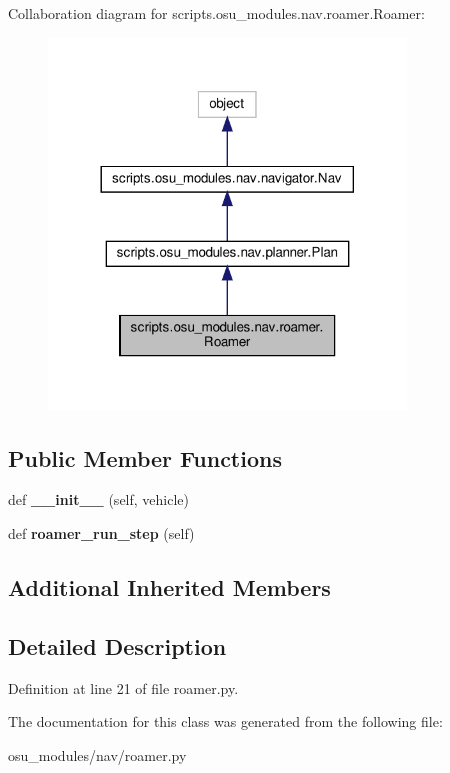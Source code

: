 Collaboration diagram for scripts.\+osu\+\_\+modules.\+nav.\+roamer.\+Roamer\+:\nopagebreak
\begin{figure}[H]
\begin{center}
\leavevmode
\includegraphics[width=269pt]{df/d24/classscripts_1_1osu__modules_1_1nav_1_1roamer_1_1Roamer__coll__graph}
\end{center}
\end{figure}
\subsection*{Public Member Functions}
\begin{DoxyCompactItemize}
\item 
\mbox{\label{classscripts_1_1osu__modules_1_1nav_1_1roamer_1_1Roamer_a7d390a18bb34cf8ccec5dc8052f96c2f}} 
def {\bfseries \+\_\+\+\_\+init\+\_\+\+\_\+} (self, vehicle)
\item 
\mbox{\label{classscripts_1_1osu__modules_1_1nav_1_1roamer_1_1Roamer_ab80437b43470af71e024f6a6f4906a86}} 
def {\bfseries roamer\+\_\+run\+\_\+step} (self)
\end{DoxyCompactItemize}
\subsection*{Additional Inherited Members}


\subsection{Detailed Description}


Definition at line 21 of file roamer.\+py.



The documentation for this class was generated from the following file\+:\begin{DoxyCompactItemize}
\item 
osu\+\_\+modules/nav/roamer.\+py\end{DoxyCompactItemize}
